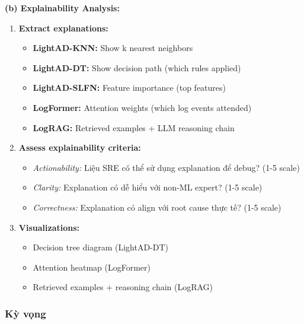 \textbf{(b) Explainability Analysis:}

\begin{enumerate}
    \item \textbf{Extract explanations:}
    \begin{itemize}
        \item \textbf{LightAD-KNN:} Show k nearest neighbors
        \item \textbf{LightAD-DT:} Show decision path (which rules applied)
        \item \textbf{LightAD-SLFN:} Feature importance (top features)
        \item \textbf{LogFormer:} Attention weights (which log events attended)
        \item \textbf{LogRAG:} Retrieved examples + LLM reasoning chain
    \end{itemize}
    
    \item \textbf{Assess explainability criteria:}
    \begin{itemize}
        \item \textit{Actionability:} Liệu SRE có thể sử dụng explanation để debug? (1-5 scale)
        \item \textit{Clarity:} Explanation có dễ hiểu với non-ML expert? (1-5 scale)
        \item \textit{Correctness:} Explanation có align với root cause thực tế? (1-5 scale)
    \end{itemize}
    
    \item \textbf{Visualizations:}
    \begin{itemize}
        \item Decision tree diagram (LightAD-DT)
        \item Attention heatmap (LogFormer)
        \item Retrieved examples + reasoning chain (LogRAG)
    \end{itemize}
\end{enumerate}

\subsubsection{Kỳ vọng}

